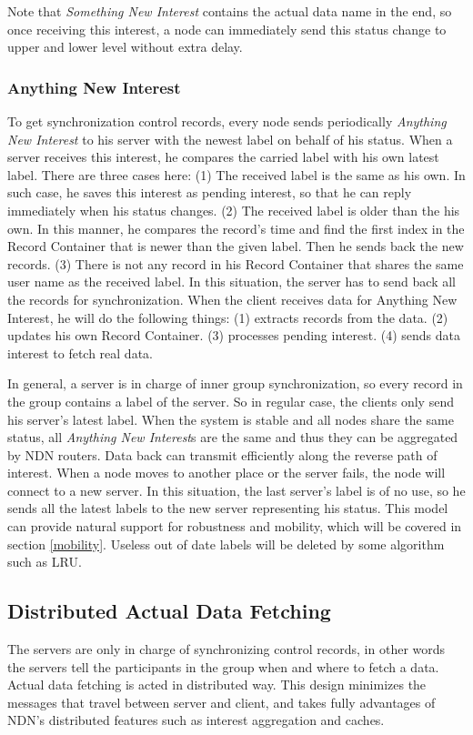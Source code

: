 \documentclass[conference]{IEEEtran}
\begin{document}
Note that \emph{Something New Interest} contains the actual data name in the end, so once receiving this interest, a node can immediately send this status change to upper and lower level without extra delay.

\subsubsection{Anything New Interest}
To get synchronization control records, every node sends periodically \emph{Anything New Interest} to his server with the newest label on behalf of his status.
When a server receives this interest, he compares the carried label with his own latest label. There are three cases here:
(1) The received label is the same as his own. In such case, he saves this interest as pending interest, so that he can reply immediately when his status changes.
(2) The received label is older than the his own. In this manner, he compares the record's time and find the first index in the Record Container that is newer than the given label. Then he sends back the new records.
(3) There is not any record in his Record Container that shares the same user name as the received label. In this situation, the server has to send back all the records for synchronization.
When the client receives data for Anything New Interest, he will do the following things:
(1) extracts records from the data.
(2) updates his own Record Container.
(3) processes pending interest.
(4) sends data interest to fetch real data.

In general, a server is in charge of inner group synchronization, so every record in the group contains a label of the server. So in regular case, the clients only send his server's latest label. When the system is stable and all nodes share the same status, all \emph{Anything New Interest}s are the same and thus they can be aggregated by NDN routers. Data back can transmit efficiently along the reverse path of interest. When a node moves to another place or the server fails, the node will connect to a new server. In this situation, the last server's label is of no use, so he sends all the latest labels to the new server representing his status. This model can provide natural support for robustness and mobility, which will be covered in section \ref{mobility}. Useless out of date labels will be deleted by some algorithm such as LRU.

\subsection{Distributed Actual Data Fetching}
The servers are only in charge of synchronizing control records, in other words the servers tell the participants in the group when and where to fetch a data. Actual data fetching is acted in distributed way. This design minimizes the messages that travel between server and client, and takes fully advantages of NDN's distributed features such as interest aggregation and caches.
\end{document}
